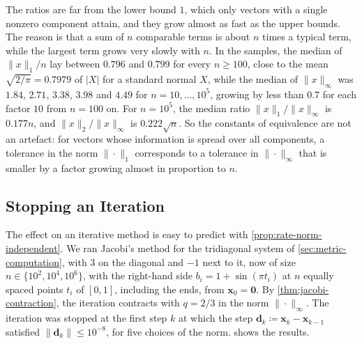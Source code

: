 The ratios are far from the lower bound $1$, which only vectors with a single nonzero component attain, and they grow almost as fast as the upper bounds. The reason is that a sum of $n$ comparable terms is about $n$ times a typical term, while the largest term grows very slowly with $n$. In the samples, the median of $\|x\|_1/n$ lay between $0.796$ and $0.799$ for every $n\ge100$, close to the mean $\sqrt{2/\pi}=0.7979$ of $|X|$ for a standard normal $X$, while the median of $\|x\|_\infty$ was $1.84$, $2.71$, $3.38$, $3.98$ and $4.49$ for $n=10,\ldots,10^5$, growing by less than $0.7$ for each factor $10$ from $n=100$ on. For $n=10^5$, the median ratio $\|x\|_1/\|x\|_\infty$ is $0.177n$, and $\|x\|_2/\|x\|_\infty$ is $0.222\sqrt n$. So the constants of equivalence are not an artefact: for vectors whose information is spread over all components, a tolerance in the norm $\|\cdot\|_1$ corresponds to a tolerance in $\|\cdot\|_\infty$ that is smaller by a factor growing almost in proportion to $n$.

\subsection{Stopping an Iteration}

The effect on an iterative method is easy to predict with \cref{prop:rate-norm-independent}. We ran Jacobi's method for the tridiagonal system of \cref{sec:metric-computation}, with $3$ on the diagonal and $-1$ next to it, now of size $n\in\{10^2,10^4,10^6\}$, with the right-hand side $b_i=1+\sin(\pi t_i)$ at $n$ equally spaced points $t_i$ of $[0,1]$, including the ends, from $\mathbf x_0=\mathbf 0$. By \cref{thm:jacobi-contraction}, the iteration contracts with $q=2/3$ in the norm $\|\cdot\|_\infty$. The iteration was stopped at the first step $k$ at which the step $\mathbf d_k\coloneqq\mathbf x_k-\mathbf x_{k-1}$ satisfied $\|\mathbf d_k\|\le10^{-8}$, for five choices of the norm.  shows the results.

\begin{table}
\end{table}

